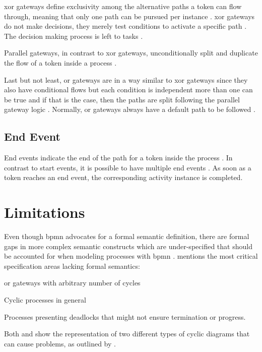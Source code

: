 \gls{xor} gateways define exclusivity among the alternative paths a token can flow through, meaning that only one path can be pursued per instance \citep{Silver2011}. \gls{xor} gateways do not make decisions, they merely test conditions to activate a specific path \citep{Silver2011}. The decision making process is left to tasks \citep{Silver2011}.

Parallel gateways, in contrast to \gls{xor} gateways, unconditionally split and duplicate the flow of a token inside a process \citep{Silver2011}.

Last but not least, \gls{or} gateways are in a way similar to \gls{xor} gateways since they also have conditional flows but each condition is independent \ie more than one can be true and if that is the case, then the paths are split following the parallel gateway logic \citep{Silver2011}. Normally, \gls{or} gateways always have a default path to be followed \citep{Silver2011}.

\subsection{End Event}

End events indicate the end of the path for a token inside the process \citep{Silver2011}. In contrast to start events, it is possible to have multiple end events \citep{Silver2011}. As soon as a token reaches an end event, the corresponding activity instance is completed.

\section{ Limitations}

Even though \gls{bpmn} advocates for a formal semantic definition, there are formal gaps in more complex semantic constructs which are under-specified that should be accounted for when modeling processes with \gls{bpmn} \citep{Soerensen2005}. \citet{Soerensen2005} mentions the most critical specification areas lacking formal semantics:
\begin{enumerate*}
	\item \gls{or} gateways with arbitrary number of cycles
	\item Cyclic processes in general
	\item Processes presenting deadlocks that might not ensure termination or progress.
\end{enumerate*}

Both  and  show the representation of two different types of cyclic diagrams that can cause problems, as outlined by \citet{Soerensen2005}.


